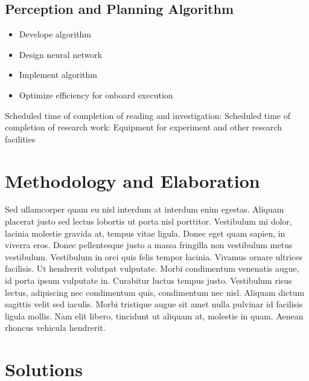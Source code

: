 \subsection{Perception and Planning Algorithm}

\begin{itemize}
    \item Develope algorithm
    \item Design neural network
    \item Implement algorithm
    \item Optimize efficiency for onboard execution
\end{itemize}

Scheduled time of completion of reading and investigation: 
Scheduled time of completion of research work:
Equipment for experiment and other research facilities


\section{Methodology and Elaboration}

Sed ullamcorper quam eu nisl interdum at interdum enim egestas. Aliquam placerat justo sed lectus lobortis ut porta nisl porttitor. Vestibulum mi dolor, lacinia molestie gravida at, tempus vitae ligula. Donec eget quam sapien, in viverra eros. Donec pellentesque justo a massa fringilla non vestibulum metus vestibulum. Vestibulum in orci quis felis tempor lacinia. Vivamus ornare ultrices facilisis. Ut hendrerit volutpat vulputate. Morbi condimentum venenatis augue, id porta ipsum vulputate in. Curabitur luctus tempus justo. Vestibulum risus lectus, adipiscing nec condimentum quis, condimentum nec nisl. Aliquam dictum sagittis velit sed iaculis. Morbi tristique augue sit amet nulla pulvinar id facilisis ligula mollis. Nam elit libero, tincidunt ut aliquam at, molestie in quam. Aenean rhoncus vehicula hendrerit.


\section{Solutions}

